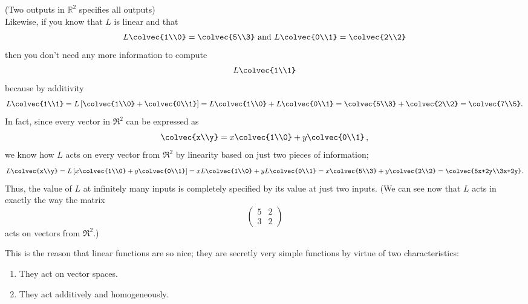 \begin{example}(Two outputs in $\mathbb{R}^2$ specifies all outputs)\\
Likewise, if you  know that $L$ is linear and that
\[
L\colvec{1\\0}=\colvec{5\\3} \text{~and~} L\colvec{0\\1}= \colvec{2\\2}
\] 
then you don't need any more information to compute
\[L\colvec{1\\1}\] because by additivity
\[
L\colvec{1\\1}= L \left[ \colvec{1\\0} + \colvec{0\\1} \right] 
=L\colvec{1\\0} + L \colvec{0\\1} = \colvec{5\\3} +\colvec{2\\2} =\colvec{7\\5}.
\]
In fact, since every vector in $\Re^2$ can be expressed as 
\[
\colvec{x\\y}= x\colvec{1\\0}+y\colvec{0\\1}\, ,
\] 
we know how $L$ acts on every vector from 
$\Re^2$ by linearity based on just  two pieces of information;
\[
L\colvec{x\\y}
= L \left[ x\colvec{1\\0}+y\colvec{0\\1} \right]
= x L\colvec{1\\0}+y L\colvec{0\\1} 
= x \colvec{5\\3}+ y\colvec{2\\2} =\colvec{5x+2y\\3x+2y}.
\]
Thus, the value of $L$ at infinitely many inputs is completely specified by its value at just two inputs.
(We can see now that $L$ acts in exactly the way the matrix 
\[
\begin{pmatrix}
5&2\\
3&2 \end{pmatrix}
\]
acts on vectors from $\Re^2$.)
\end{example}


This is the reason that linear functions are so nice;
they are secretly very simple functions by virtue of two characteristics:
\begin{enumerate}\item They act on vector spaces.
\item They act additively and homogeneously. 
\end{enumerate}


